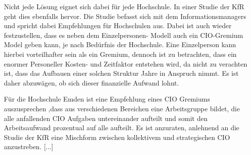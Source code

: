 \documentclass{article}
\begin{document}
Nicht jede Lösung eignet sich dabei für jede Hochschule. In einer Studie der KfR geht dies ebenfalls hervor. Die Studie
befasst sich mit dem Informationsmanagers und spricht dabei Empfehlungen für Hochschulen aus. Dabei ist auch wieder
festzustellen, dass es neben dem Einzelpersonen- Modell auch ein CIO-Gremium Model geben kann, je nach Bedürfnis der
Hochschule. Eine Einzelperson kann hierbei vorteilhafter sein als ein Gremium, dennoch ist zu betrachten, dass ein
enormer Personeller Kosten- und Zeitfaktor entstehen wird, da nicht zu verachten ist, dass das Aufbauen einer solchen
Struktur Jahre in Anspruch nimmt. Es ist daher abzuwägen, ob sich dieser finanzielle Aufwand lohnt. 

Für die Hochschule Emden ist eine Empfehlung eines CIO Gremiums auszusprechen ,dass aus verschiedenen Bereichen eine
Arbeitsgruppe bildet, die alle anfallenden CIO Aufgaben untereinander aufteilt und somit den Arbeitsaufwand prozentual
auf alle aufteilt. Es ist anzuraten, anlehnend an die Studie der KfR eine Mischform zwischen kollektivem und
strategischen CIO anzustreben. [...]
\end{document}
